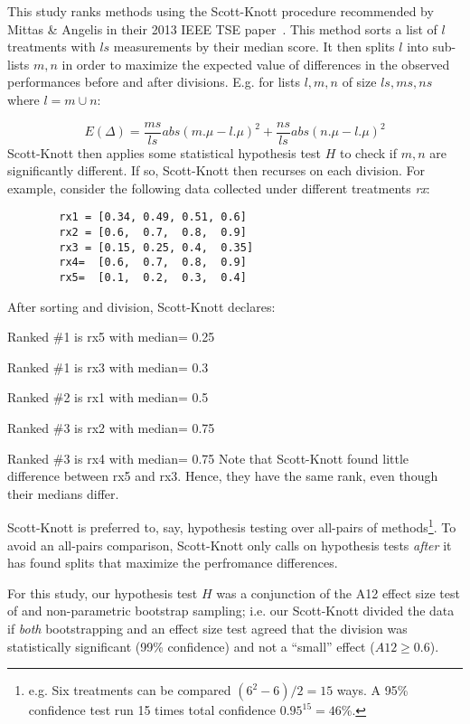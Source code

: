 This study ranks methods using the Scott-Knott
procedure recommended by Mittas \& Angelis in their 2013
IEEE TSE paper~\cite{mittas13}.  This method
sorts a list of $l$ treatments with $ls$ measurements by their median
score. It then
splits $l$ into sub-lists $m,n$ in order to maximize the expected value of
 differences  in the observed performances
before and after divisions. E.g. for lists $l,m,n$ of size $ls,ms,ns$ where $l=m\cup n$:


{\footnotesize
\[E(\Delta)=\frac{ms}{ls}abs(m.\mu - l.\mu)^2 + \frac{ns}{ls}abs(n.\mu - l.\mu)^2\]}
Scott-Knott then applies some statistical hypothesis test $H$ to check
if $m,n$ are significantly different. If so, Scott-Knott then recurses on each division.
For example, consider the following data collected under different treatments {\em rx}:


{\scriptsize \begin{verbatim}
        rx1 = [0.34, 0.49, 0.51, 0.6]
        rx2 = [0.6,  0.7,  0.8,  0.9]
        rx3 = [0.15, 0.25, 0.4,  0.35]
        rx4=  [0.6,  0.7,  0.8,  0.9]
        rx5=  [0.1,  0.2,  0.3,  0.4]
\end{verbatim}}
\noindent
After sorting and division, Scott-Knott declares:
\bi
\item Ranked \#1 is rx5 with median= 0.25
\item Ranked \#1 is rx3 with median= 0.3
\item Ranked \#2 is rx1 with median= 0.5
\item Ranked \#3 is rx2 with median= 0.75
\item Ranked \#3 is rx4 with median= 0.75
\ei
Note that Scott-Knott found  little
difference between rx5 and rx3. Hence,
they have the same rank, even though their medians differ.

Scott-Knott is preferred to, say, hypothesis testing
over all-pairs of methods\footnote{e.g. Six treatments
can be compared $(6^2-6)/2=15$ ways.
A 95\% confidence test run 15 times total confidence 
$0.95^{15} = 46$\%.}.
To avoid an all-pairs comparison, Scott-Knott only calls on hypothesis
tests {\em after} it has found splits that maximize the perfromance differences.
 
For this study, our hypothesis test $H$ was a
conjunction of the A12 effect size test of  and
non-parametric bootstrap sampling; i.e. our
Scott-Knott divided the data if {\em both}
bootstrapping and an effect size test agreed that
the division was statistically significant (99\%
confidence) and not a ``small'' effect ($A12 \ge
0.6$).

